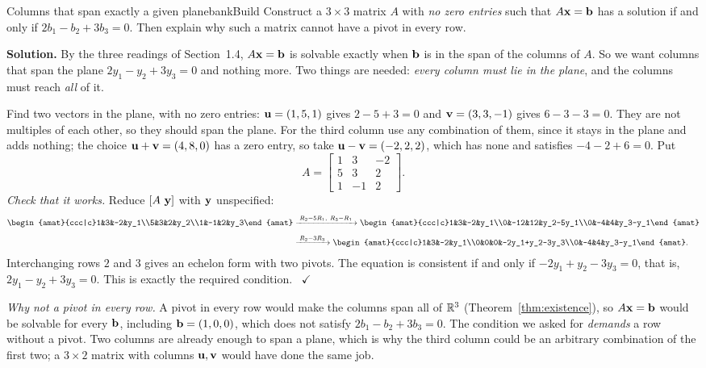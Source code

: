 \documentclass[11pt]{article}
\begin{document}
\begin{exmp}{Columns that span exactly a given plane}{bankBuild}
Construct a $3\times3$ matrix $A$ with \emph{no zero entries} such that $A\mathbf{x}=\mathbf{b}$ has a solution if and only if $2b_1-b_2+3b_3=0$. Then explain why such a matrix cannot have a pivot in every row.

\textbf{Solution.} By the three readings of Section~1.4, $A\mathbf{x}=\mathbf{b}$ is solvable exactly when $\mathbf{b}$ is in the span of the columns of $A$. So we want columns that span the plane $2y_1-y_2+3y_3=0$ and nothing more. Two things are needed: \emph{every column must lie in the plane}, and the columns must reach \emph{all} of it.

Find two vectors in the plane, with no zero entries: $\mathbf{u}=(1,5,1)$ gives $2-5+3=0$ and $\mathbf{v}=(3,3,-1)$ gives $6-3-3=0$. They are not multiples of each other, so they should span the plane. For the third column use any combination of them, since it stays in the plane and adds nothing; the choice $\mathbf{u}+\mathbf{v}=(4,8,0)$ has a zero entry, so take $\mathbf{u}-\mathbf{v}=(-2,2,2)$, which has none and satisfies $-4-2+6=0$. Put
\[
A=\begin{bmatrix}1&3&-2\\5&3&2\\1&-1&2\end{bmatrix}.
\]
\emph{Check that it works.} Reduce $[A\ \bv{y}]$ with $\mathbf{y}$ unspecified:
\begin{align*}
\begin{amat}{ccc|c}1&3&-2&y_1\\5&3&2&y_2\\1&-1&2&y_3\end{amat}
&\rops{R_2-5R_1,\ R_3-R_1}
\begin{amat}{ccc|c}1&3&-2&y_1\\0&-12&12&y_2-5y_1\\0&-4&4&y_3-y_1\end{amat}\\[4pt]
&\rops{R_2-3R_3}
\begin{amat}{ccc|c}1&3&-2&y_1\\0&0&0&-2y_1+y_2-3y_3\\0&-4&4&y_3-y_1\end{amat}.
\end{align*}
Interchanging rows $2$ and $3$ gives an echelon form with two pivots. The equation is consistent if and only if $-2y_1+y_2-3y_3=0$, that is, $2y_1-y_2+3y_3=0$. This is exactly the required condition. \ $\checkmark$

\emph{Why not a pivot in every row.} A pivot in every row would make the columns span all of $\mathbb{R}^3$ (Theorem~\ref{thm:existence}), so $A\mathbf{x}=\mathbf{b}$ would be solvable for every $\mathbf{b}$, including $\mathbf{b}=(1,0,0)$, which does not satisfy $2b_1-b_2+3b_3=0$. The condition we asked for \emph{demands} a row without a pivot. Two columns are already enough to span a plane, which is why the third column could be an arbitrary combination of the first two; a $3\times2$ matrix with columns $\mathbf{u},\mathbf{v}$ would have done the same job.
\end{exmp}
\end{document}
